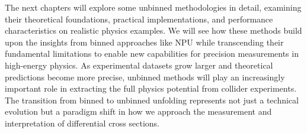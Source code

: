     The next chapters will explore some unbinned methodologies in detail, examining their theoretical foundations, practical implementations, and performance characteristics on realistic physics examples.
    We will see how these methods build upon the insights from binned approaches like NPU while transcending their fundamental limitations to enable new capabilities for precision measurements in high-energy physics.
    As experimental datasets grow larger and theoretical predictions become more precise, unbinned methods will play an increasingly important role in extracting the full physics potential from collider experiments.
    The transition from binned to unbinned unfolding represents not just a technical evolution but a paradigm shift in how we approach the measurement and interpretation of differential cross sections.